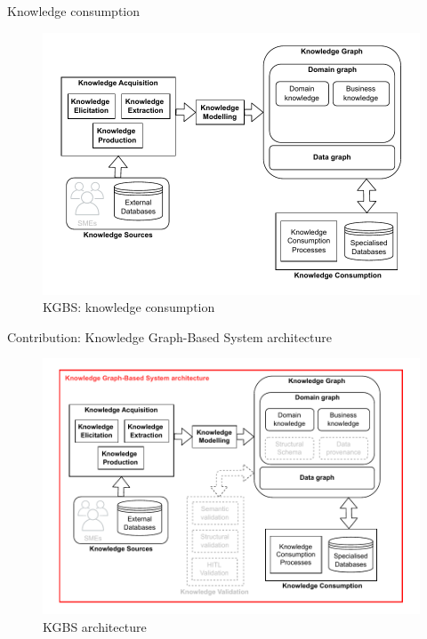 \begin{frame}{Knowledge consumption}

    \begin{figure} [H]
        \begin{center}
            \includegraphics[scale=0.6]{images/KGBS-knowledge-consumption.pdf} 
            \caption{KGBS: knowledge consumption} 
        \end{center}
    \end{figure}

\end{frame}

\begin{frame}{Contribution: Knowledge Graph-Based System architecture}

    \begin{figure} [H]
        \begin{center}
            \includegraphics[scale=0.5]{images/KGBS-architecture.pdf} 
            \caption{KGBS architecture} 
        \end{center}
    \end{figure}

\end{frame}

